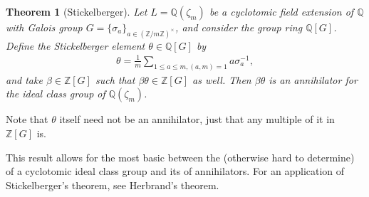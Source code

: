 \documentclass[12pt]{article}
\newtheorem{Theo}{Theorem}
\newcommand{\mb}{\mathbb}
\newcommand{\Z}{\mb{Z}}
\newcommand{\Q}{\mb{Q}}
\newcommand{\<}{\langle}
\renewcommand{\>}{\rangle}
\begin{document}
\begin{Theo}[Stickelberger]
Let $L=\mathbb{Q}(\zeta_m)$ be a cyclotomic field extension of $\Q$ with Galois group $G=\{\sigma_a\}_{a\in(\Z/m\Z)^\times}$, and consider the group ring $\Q[G]$.  Define the Stickelberger element $\theta\in\Q[G]$ by
\begin{align*}
\theta=\frac{1}{m}\sum_{1\leq a\leq m, (a,m)=1}a\sigma_a^{-1},
\end{align*}
and take $\beta\in\Z[G]$ such that $\beta\theta\in\Z[G]$ as well.  Then $\beta\theta$ is an annihilator for the ideal class group of $\Q(\zeta_m)$.
\end{Theo}

Note that $\theta$ itself need not be an annihilator, just that any multiple of it in $\Z[G]$ is.

This result allows for the most basic  between the (otherwise hard to determine)  of a cyclotomic ideal class group and its  of annihilators.  For an application of Stickelberger's theorem, see Herbrand's theorem.
\end{document}
